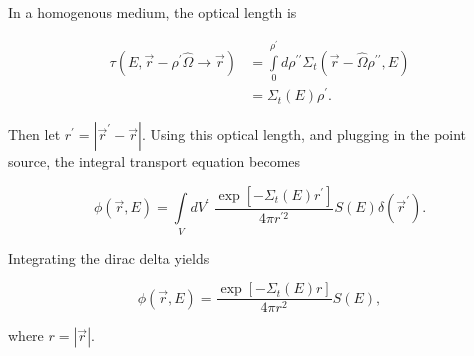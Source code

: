 \documentclass{hw-template}
\newcommand{\p}{^\prime}
\newcommand{\hOm}{\hat{\Omega}}
\begin{document}
In a homogenous medium, the optical length is

\begin{align}
    \tau(E, \vec{r} - \rho\p\hOm\rightarrow\vec{r}) &= \int\limits_0^{\rho\p}d\rho^{\prime\prime}\Sigma_t(\vec{r} - \hOm\rho^{\prime\prime}, E)\\
    &= \Sigma_t(E)\rho\p.
\end{align}

Then let $r\p = |\vec{r}\p - \vec{r}|$. Using this optical length, and plugging in the point source, the integral transport equation becomes

\begin{equation}
    \phi(\vec{r}, E) = \int\limits_V dV\p\; \frac{\exp\left[-\Sigma_t(E) r\p \right]}{4\pi r^{\prime 2}}S(E)\delta(\vec{r}\p).
\end{equation}

Integrating the dirac delta yields

\begin{equation}
    \phi(\vec{r}, E) =  \frac{\exp\left[-\Sigma_t(E) r \right]}{4\pi r^{ 2}}S(E),
\end{equation}

where $r = |\vec{r}|$.
\end{document}
